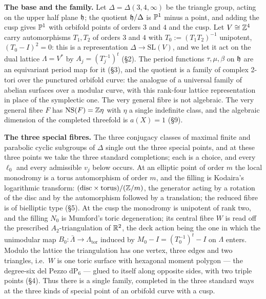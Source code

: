 \noindent\textbf{The base and the family.}
Let $\Delta = \Delta(3,4,\infty)$ be the triangle group, acting on the upper half plane $\mathfrak{h}$; the quotient $\mathfrak{h}/\Delta$ is $\mathbb{P}^1$ minus a point, and adding the cusp gives $\mathbb{P}^1$ with orbifold points of orders $3$ and $4$ and the cusp. Let $V \cong \mathbb{Z}^4$ carry automorphisms $T_1, T_2$ of orders $3$ and $4$ with $T_0 := (T_1 T_2)^{-1}$ unipotent, $(T_0 - I)^2 = 0$: this is a representation $\Delta \to \mathrm{SL}(V)$, and we let it act on the dual lattice $\Lambda = V^*$ by $A_j = (T_j^{-1})^t$ (\S2). The period functions $\tau, \mu, \beta$ on $\mathfrak{h}$ are an equivariant period map for it (\S3), and the quotient is a family of complex 2-tori over the punctured orbifold curve: the analogue of a universal family of abelian surfaces over a modular curve, with this rank-four lattice representation in place of the symplectic one. The very general fibre is not algebraic. The very general fibre $F$ has $\mathrm{NS}(F) = \mathbb{Z}\eta$ with $\eta$ a single indefinite class, and the algebraic dimension of the completed threefold is $a(X) = 1$ (\S9).

\medskip
\noindent\textbf{The three special fibres.}
The three conjugacy classes of maximal finite and parabolic cyclic subgroups of $\Delta$ single out the three special points, and at these three points we take the three standard completions; each is a choice, and every $\ell_0$ and every admissible $v_j$ below occurs. At an elliptic point of order $m$ the local monodromy is a torus automorphism of order $m$, and the filling is Kodaira's logarithmic transform: $(\mathrm{disc} \times \mathrm{torus})/(\mathbb{Z}/m)$, the generator acting by a rotation of the disc and by the automorphism followed by a translation; the reduced fibre is of bielliptic type (\S5). At the cusp the monodromy is unipotent of rank two, and the filling $N_0$ is Mumford's toric degeneration; its central fibre $W$ is read off the prescribed $A_2$-triangulation of $\mathbb{R}^2$, the deck action being the one in which the unimodular map $B_0 \colon \bar\Lambda \to \Lambda_{\mathrm{tor}}$ induced by $M_0 - I = (T_0^{-1})^t - I$ on $\Lambda$ enters. Modulo the lattice the triangulation has one vertex, three edges and two triangles, i.e.\ $W$ is one toric surface with hexagonal moment polygon --- the degree-six del Pezzo $\mathrm{dP}_6$ --- glued to itself along opposite sides, with two triple points (\S4). Thus there is a single family, completed in the three standard ways at the three kinds of special point of an orbifold curve with a cusp.

